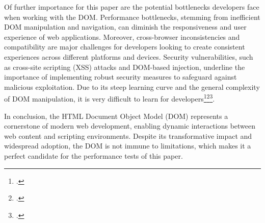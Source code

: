 Of further importance for this paper are the potential bottlenecks developers face when working with the DOM. Performance bottlenecks, stemming from inefficient DOM manipulation and navigation, can diminish the responsiveness and user experience of web applications. Moreover, cross-browser inconsistencies and compatibility are major challenges for developers looking to create consistent experiences across different platforms and devices. Security vulnerabilities, such as cross-site scripting (XSS) attacks and DOM-based injection, underline the importance of implementing robust security measures to safeguard against malicious exploitation. Due to its steep learning curve and the general complexity of DOM manipulation, it is very difficult to learn for developers\footcite{dohr_vanilla_0000}\footcite{cody_arsenault_20_nodate}\footcite{w3schools_javascript_nodate}.

In conclusion, the HTML Document Object Model (DOM) represents a cornerstone of modern web development, enabling dynamic interactions between web content and scripting environments. Despite its transformative impact and widespread adoption, the DOM is not immune to limitations, which makes it a perfect candidate for the performance tests of this paper.